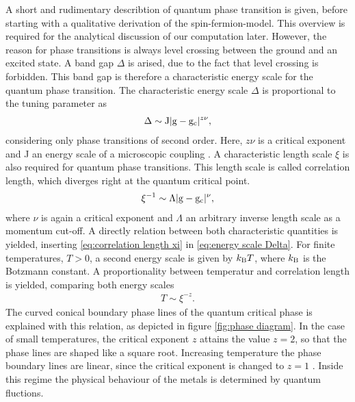 A short and rudimentary describtion of quantum phase transition is given, before starting with a qualitative derivation of the spin-fermion-model.
This overview is required for the analytical discussion of our computation later.
However, the reason for phase transitions is always level crossing between the ground and an excited state.
A band gap $\Delta$ is arised, due to the fact that level crossing is forbidden.
This band gap is therefore a characteristic energy scale for the quantum phase transition.
The characteristic energy scale $\Delta$ is proportional to the tuning parameter as
%
\begin{align}
	\Delta \sim \mathrm{J} |\mathrm{g} - \mathrm{g}_{\mathrm{c}}|^{z \nu},
	\label{eq:energy scale Delta}
\end{align}
%
considering only phase transitions of second order.
Here, $z\nu$ is a critical exponent and J an energy scale of a microscopic coupling \cite{SachdevQCP}.
A characteristic length scale $\xi$ is also required for quantum phase transitions.
This length scale is called correlation length, which diverges right at the quantum critical point.
%
\begin{align}
	\xi^{-1} \sim \Lambda |\mathrm{g} - \mathrm{g}_{\mathrm{c}}|^{\nu},
	\label{eq:correlation length xi}
\end{align}
%
where $\nu$ is again a critical exponent and $\Lambda$ an arbitrary inverse length scale as a momentum cut-off.
A directly relation between both characteristic quantities is yielded, inserting \eqref{eq:correlation length xi} in \eqref{eq:energy scale Delta}.
For finite temperatures, $T > 0$, a second energy scale is given by $k_{\mathrm{B}} T$, where $k_{\mathrm{B}}$ is the Botzmann constant.
A proportionality between temperatur and correlation length is yielded, comparing both energy scales
%
\begin{align}
	T \sim \xi^{-z}.
	\label{relation temperature and correlation length}
\end{align}
%
The curved conical boundary phase lines of the quantum critical phase is explained with this relation, as depicted in figure \ref{fig:phase diagram}.
In the case of small temperatures, the critical exponent $z$ attains the value $z = 2$, so that the phase lines are shaped like a square root.
Increasing temperature the phase boundary lines are linear, since the critical exponent is changed to $z = 1$ \cite{Patel&Sachdev}.
Inside this regime the physical behaviour of the metals is determined by quantum fluctions.

